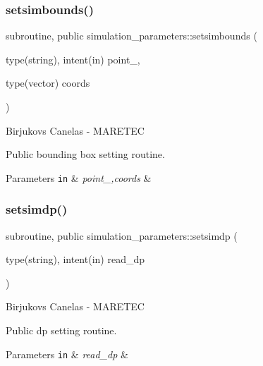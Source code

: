 \subsubsection{\texorpdfstring{setsimbounds()}{setsimbounds()}}
{\footnotesize\ttfamily subroutine, public simulation\+\_\+parameters\+::setsimbounds (\begin{DoxyParamCaption}\item[{type(string), intent(in)}]{point\+\_\+,  }\item[{type(vector)}]{coords }\end{DoxyParamCaption})}



Birjukovs Canelas -\/ M\+A\+R\+E\+T\+EC 

Public bounding box setting routine. 
\begin{DoxyParams}[1]{Parameters}
\mbox{\tt in}  & {\em point\+\_\+,coords} & \\
\hline
\end{DoxyParams}
\mbox{\label{namespacesimulation__parameters_a757c1773e1c21deb9f3bfd2dc258bd1a}} 
\subsubsection{\texorpdfstring{setsimdp()}{setsimdp()}}
{\footnotesize\ttfamily subroutine, public simulation\+\_\+parameters\+::setsimdp (\begin{DoxyParamCaption}\item[{type(string), intent(in)}]{read\+\_\+dp }\end{DoxyParamCaption})}



Birjukovs Canelas -\/ M\+A\+R\+E\+T\+EC 

Public dp setting routine. 
\begin{DoxyParams}[1]{Parameters}
\mbox{\tt in}  & {\em read\+\_\+dp} & \\
\hline
\end{DoxyParams}
\mbox{\label{namespacesimulation__parameters_a21b04e29ccee801263abc6e27fba026f}} 
